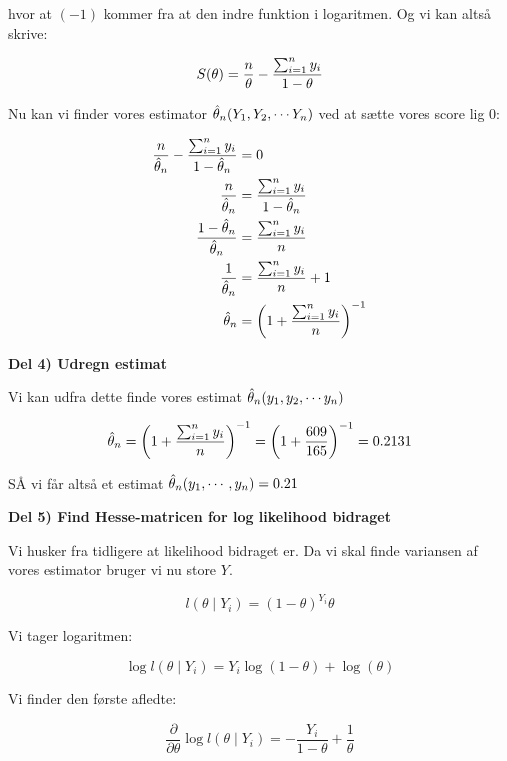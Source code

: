 hvor at $(-1)$ kommer fra at den indre funktion i logaritmen. Og vi kan altså skrive:

\begin{equation}
    S(\theta) = \frac{n}{\theta} - \frac{\sum_{i=1}^{n} y_i}{1- \theta}
\end{equation}

Nu kan vi finder vores estimator $\hat{\theta}_n (Y_1, Y_2, \cdots Y_n)$ ved at sætte vores score lig 0:

\begin{align}
    \frac{n}{\hat{\theta}_n} - \frac{\sum_{i=1}^{n} y_i}{1- \hat{\theta}_n} &= 0 \\
    \frac{n}{\hat{\theta}_n} &= \frac{\sum_{i=1}^{n} y_i}{1- \hat{\theta}_n} \\
    \frac{1 - \hat{\theta}_n}{\hat{\theta}_n} &= \frac{\sum_{i=1}^{n} y_i}{n} \\
    \frac{1}{\hat{\theta}_n} &=  \frac{\sum_{i=1}^{n} y_i}{n} + 1 \\
    \hat{\theta}_n &= \left( 1 + \frac{\sum_{i=1}^{n} y_i}{n}\right)^{-1}
\end{align}


\textbf{Del 4) Udregn estimat}

Vi kan udfra dette finde vores estimat $\hat{\theta}_n(y_1, y_2, \cdots y_n)$

\begin{equation}
\hat{\theta}_n = \left( 1 + \frac{\sum_{i=1}^{n} y_i}{n}\right)^{-1} = \left( 1 + \frac{609}{165}\right)^{-1} = 0.2131
\end{equation}

SÅ vi får altså et estimat $\hat{\theta}_n(y_1, \cdots, y_n) = 0.21$

\textbf{Del 5) Find Hesse-matricen for log likelihood bidraget}

Vi husker fra tidligere at likelihood bidraget er. Da vi skal finde variansen af vores estimator bruger vi nu store $Y$.

\begin{equation}
    l (\theta \mid Y_i) = (1 - \theta)^{Y_i} \theta
\end{equation}

Vi tager logaritmen:

\begin{equation}
    \log l (\theta \mid Y_i) = Y_i \log(1 - \theta)  + \log(\theta)
\end{equation}

Vi finder den første afledte:

\begin{equation}
    \frac{\partial}{\partial \theta} \log l (\theta \mid Y_i) = - \frac{Y_i}{1 -\theta } + \frac{1}{\theta}
\end{equation}

